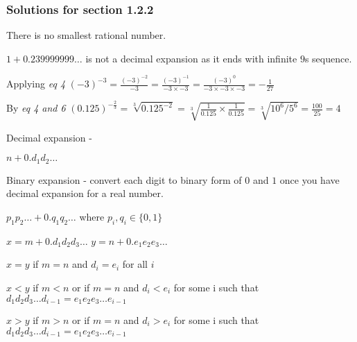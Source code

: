 \documentclass[12pt]{article}
\begin{document}
\subsubsection{Solutions for section 1.2.2}

\begin{enumerate}
  \begin{item}
    There is no smallest rational number.
  \end{item}

  \begin{item}
    $1 + 0.239999999\ldots$ is not a decimal expansion as it ends with infinite $9$s sequence.
  \end{item}

  \begin{item}
    Applying {\it eq 4} $ (-3)^{-3} = \frac{(-3)^{-2}}{-3} = \frac{(-3)^{-1}}{-3 \times -3} =
    \frac{(-3)^{0}}{-3 \times -3 \times-3} = -{\frac{1}{27}}
    $
  \end{item}

  \begin{item}
    By {\it eq 4 and 6} $(0.125)^{-\frac{2}{3}} = \sqrt[3]{0.125^{-2}} = \sqrt[3]{\frac{1}{0.125} \times \frac{1}{0.125}} = \sqrt[3]{10^6/5^6} = \frac{100}{25} = 4$
  \end{item}

  \begin{item}
    Decimal expansion -

    $n + 0.d_1d_2\ldots$

    Binary expansion - convert each digit to binary form of $0$ and $1$ once you have decimal expansion for a real number.

    $p_1p_2\ldots + 0.q_1q_2\ldots$ where $p_i, q_i \in \{0,1\}$
  \end{item}

  \begin{item}

    $x = m + 0.d_1d_2d_3\ldots$ $y = n + 0.e_1e_2e_3\ldots$

    $x = y$ if $ m = n $ and $ d_i = e_i $ for all $i$

    $x < y$ if $ m < n $ or if $ m = n $ and $d_i < e_i$ for some i such that $ d_1d_2d_3\ldots d_{i-1} = e_1e_2e_3\ldots e_{i-1} $

    $x > y$ if $ m > n $ or if $ m = n $ and $d_i > e_i$ for some i such that $ d_1d_2d_3\ldots d_{i-1} = e_1e_2e_3\ldots e_{i-1} $

    
  \end{item}


\end{enumerate}
\end{document}
